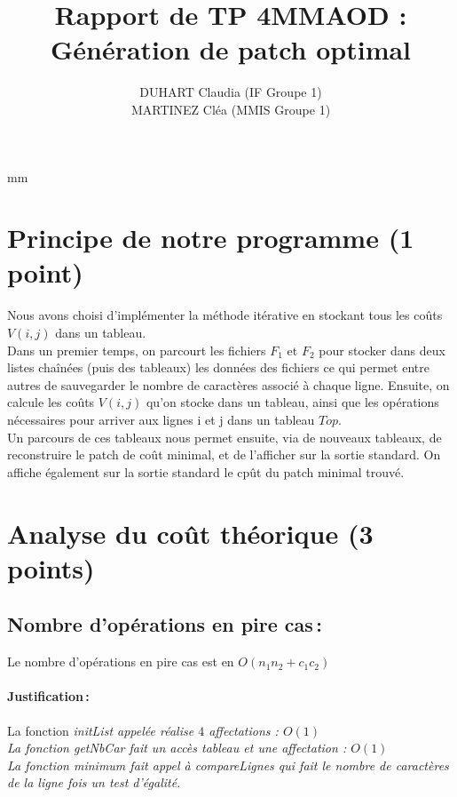 \documentclass[a4paper, 10pt, french]{article}
\title{Rapport de TP 4MMAOD : Génération de patch optimal}
\author{
DUHART Claudia (IF Groupe 1) 
\\ MARTINEZ Cléa (MMIS Groupe 1) 
}
\begin{document}
\maketitle
{} mm 

\section{Principe de notre  programme (1 point)}

Nous avons choisi d'implémenter la méthode itérative en stockant tous les coûts $V(i,j)$ dans un tableau. \\
Dans un premier temps, on parcourt les fichiers $F_1$ et $F_2$ pour stocker dans deux listes chaînées (puis des tableaux)  les données des fichiers ce qui permet entre autres de sauvegarder le nombre de caractères associé à chaque ligne. 
Ensuite, on calcule les coûts $V(i,j)$ qu'on stocke dans un tableau, ainsi que les opérations nécessaires pour arriver aux lignes i et j dans un tableau $Top$. \\
Un parcours de ces tableaux nous permet ensuite, via de nouveaux tableaux, de reconstruire le patch de coût minimal, et de l'afficher sur la sortie standard. On affiche également sur la sortie standard le cpût du patch minimal trouvé. \\
\section{Analyse du coût théorique (3 points)}


  \subsection{Nombre  d'opérations en pire cas\,: }
  
  Le nombre d'opérations en pire cas est en $O(n_1 n_2 + c_1c_2)$
    \paragraph{Justification\,: \\ }
    

        La fonction \it initList \rm appelée  réalise $4$ affectations : $O(1)$ \\
        La fonction \it getNbCar \rm fait un accès tableau et une affectation : $O(1)$ \\
        La fonction \it minimum \rm fait appel à \it compareLignes \rm qui fait le nombre de caractères de la ligne fois un test d'égalité. 
        
\end{document}
